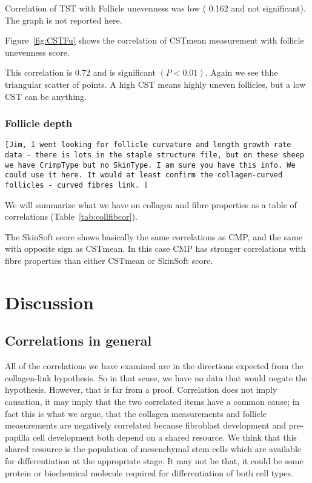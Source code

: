 \documentclass[titlepage]{article}  %
\begin{document}
Correlation of TST with Follicle unevenness was low ( 0.162 and not significant). The graph is not reported here.

Figure~\ref{fig:CSTFu} shows the correlation of CSTmean measurement with follicle unevenness score.

This correlation is 0.72 and is significant $(P<0.01)$. Again we see thhe triangular scatter of points. A high CST means highly uneven follicles, but a low CST can be anything.

\subsubsection{Follicle depth}

\begin{verbatim}
[Jim, I went looking for follicle curvature and length growth rate data - there is lots in the staple structure file, but on these sheep we have CrimpType but no SkinType. I am sure you have this info. We could use it here. It would at least confirm the collagen-curved follicles - curved fibres link. ]
\end{verbatim}


We will summarize what we have on collagen and fibre properties as a table of correlations (Table~\ref{tab:collfibcor}).

The SkinSoft score shows basically the same correlations as CMP, and the same with opposite sign as CSTmean. In this case CMP has stronger correlations with fibre properties than either CSTmean or SkinSoft score.

\clearpage
\section{Discussion}
\subsection{Correlations in general}
 All of the correlations we have examined are in the directions expected from the collagen-link hypothesis.  So in that sense, we have no data that would negate the hypothesis. However, that is far from a proof. Correlation does not imply causation, it may imply that the two correlated items have a common cause; in fact this is what we argue, that the collagen measurements and follicle measurements are negatively correlated because fibroblast development and pre-papilla cell development both depend on a shared resource. We think that this shared resource is the population of mesenchymal stem cells which are available for differentiation at the appropriate stage. It may not be that, it could be some protein or biochemical molecule required for differentiation of both cell types.
\end{document}
